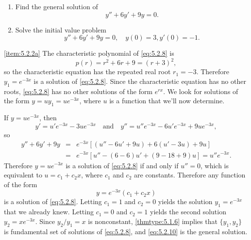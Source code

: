 \documentclass{ximera}
\begin{document}
\begin{example}\label{example:5.2.2}
\begin{enumerate}
\item\label{item:5.2.2a}%
Find the general solution of
\begin{equation} \label{eq:5.2.8}
y''+6y'+9y=0.
\end{equation}

\item\label{item:5.2.2b}%
Solve the initial value problem
\begin{equation} \label{eq:5.2.9}
y''+6y'+9y=0, \quad   y(0)=3,  y'(0)=-1.
\end{equation}
\end{enumerate}

\begin{explanation}
\ref{item:5.2.2a}  The characteristic polynomial of
 \eqref{eq:5.2.8} is
$$
p(r)=r^2+6r+9=(r+3)^2,
$$
so the characteristic equation has the repeated real root $r_1=-3$.
Therefore $y_1=e^{-3x}$ is a solution of \eqref{eq:5.2.8}. Since the
characteristic equation has no other roots, \eqref{eq:5.2.8}
has no other  solutions of the form $e^{rx}$.
 We  look for  solutions of the form
$y=uy_1=ue^{-3x}$,
where $u$ is a function that we'll now
determine.

If $y=ue^{-3x}$, then
$$
y'=u'e^{-3x}-3ue^{-3x}\quad\mbox{and}\quad
y''=u''e^{-3x}-6u'e^{-3x}+9ue^{-3x},
$$
so
\begin{eqnarray*}
y''+6y'+9y&=&e^{-3x}\left[(u''-6u'+9u)+6(u'-3u)+9u\right]\\
&=&e^{-3x}\left[u''-(6-6)u'+(9-18+9)u\right]=u''e^{-3x}.
\end{eqnarray*}
Therefore $y=ue^{-3x}$ is a solution of \eqref{eq:5.2.8} if and only if
$u''=0$, which is equivalent to $u=c_1+c_2x$, where $c_1$ and $c_2$
are constants. Therefore any function of the form
\begin{equation} \label{eq:5.2.10}
y=e^{-3x}(c_1+c_2x)
\end{equation}
is  a solution of \eqref{eq:5.2.8}.
Letting $c_1=1$ and $c_2=0$  yields the solution
 $y_1=e^{-3x}$ that we already knew. Letting $c_1=0$ and $c_2=1$
yields the second solution $y_2=xe^{-3x}$. Since
$y_2/y_1=x$
is nonconstant, \ref{thmtype:5.1.6} implies that   $\{y_1,y_2\}$ is
fundamental set of solutions of \eqref{eq:5.2.8}, and \eqref{eq:5.2.10}
is the general solution.


\end{explanation}
\end{example}
\end{document}
